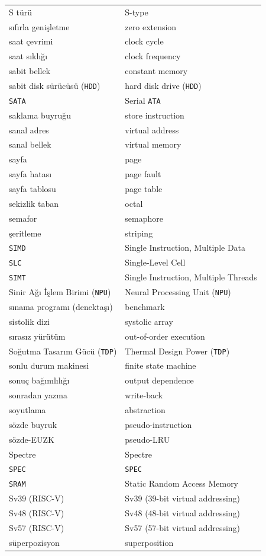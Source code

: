 {\begin{longtable}{@{}p{7.6cm}p{7.6cm}@{}}
S türü & S-type \\
sıfırla genişletme & zero extension \\
saat çevrimi & clock cycle \\
saat sıklığı & clock frequency \\
sabit bellek & constant memory \\
sabit disk sürücüsü (\texttt{HDD}) & hard disk drive (\texttt{HDD}) \\
\texttt{SATA} & Serial \texttt{ATA} \\
saklama buyruğu & store instruction \\
sanal adres & virtual address \\
sanal bellek & virtual memory \\
sayfa & page \\
sayfa hatası & page fault \\
sayfa tablosu & page table \\
sekizlik taban & octal \\
semafor & semaphore \\
şeritleme & striping \\
\texttt{SIMD} & Single Instruction, Multiple Data \\
\texttt{SLC} & Single-Level Cell \\
\texttt{SIMT} & Single Instruction, Multiple Threads \\
Sinir Ağı İşlem Birimi (\texttt{NPU}) & Neural Processing Unit (\texttt{NPU}) \\
sınama programı (denektaşı) & benchmark \\
sistolik dizi & systolic array \\
sırasız yürütüm & out-of-order execution \\
Soğutma Tasarım Gücü (\texttt{TDP}) & Thermal Design Power (\texttt{TDP}) \\
sonlu durum makinesi & finite state machine \\
sonuç bağımlılığı & output dependence \\
sonradan yazma & write-back \\
soyutlama & abstraction \\
sözde buyruk & pseudo-instruction \\
sözde-EUZK & pseudo-LRU \\
Spectre & Spectre \\
\texttt{SPEC} & \texttt{SPEC} \\
\texttt{SRAM} & Static Random Access Memory \\
Sv39 (RISC-V) & Sv39 (39-bit virtual addressing) \\
Sv48 (RISC-V) & Sv48 (48-bit virtual addressing) \\
Sv57 (RISC-V) & Sv57 (57-bit virtual addressing) \\
süperpozisyon & superposition \\


\end{longtable}}
